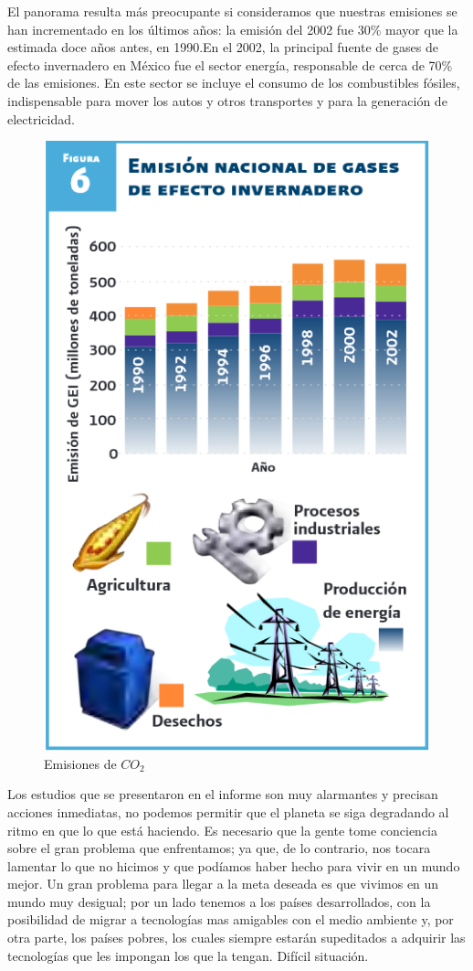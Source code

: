 \documentclass[12pt,a4paper]{article}
\begin{document}
\noindent El  panorama resulta  más  preocupante  si  consideramos  que nuestras  emisiones  se  han  incrementado  en  los últimos años: la emisión del 2002 fue 30\% mayor que la estimada doce años antes, en 1990.En el 2002, la principal fuente de gases de efecto invernadero  en  México  fue  el  sector  energía, responsable  de  cerca  de  70\%  de  las  emisiones. En  este  sector  se  incluye  el  consumo  de  los combustibles fósiles, indispensable para mover los autos y otros transportes y para la generación de electricidad.\cite{3} 

\begin{figure}[H]
  \centering
   \includegraphics[scale=0.8]{grafica2.PNG}
  \caption{Emisiones de $CO_2$}
  \label{fig:ejemplo}
\end{figure} 

\noindent Los estudios que se presentaron en el informe son muy alarmantes y precisan acciones inmediatas, no podemos permitir que el planeta se siga degradando al ritmo en que lo que está haciendo. Es necesario que la gente tome conciencia sobre el gran problema que enfrentamos; ya que, de lo contrario, nos tocara lamentar lo que no hicimos y que podíamos haber hecho para vivir en un mundo mejor.  Un gran problema para llegar a la meta deseada es que vivimos en un mundo muy desigual; por un lado tenemos a los países desarrollados, con la posibilidad de migrar a tecnologías mas amigables con el medio ambiente y, por otra parte, los países pobres, los cuales siempre estarán supeditados a adquirir las tecnologías que les impongan los que la tengan. Difícil situación.
\end{document}
